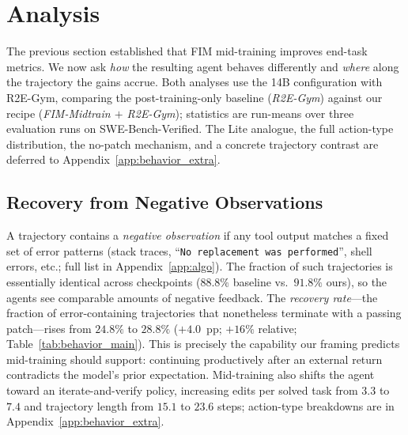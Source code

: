 
\section{Analysis}
\label{sec:analysis}
\vspace{-0.5ex}

The previous section established that FIM mid-training improves end-task
metrics. We now ask \emph{how} the resulting agent behaves differently
and \emph{where} along the trajectory the gains accrue. Both analyses
use the 14B configuration with R2E-Gym, comparing the
post-training-only baseline (\emph{R2E-Gym}) against our recipe
(\emph{FIM-Midtrain $+$ R2E-Gym}); statistics are run-means over three
evaluation runs on SWE-Bench-Verified. The Lite analogue, the full
action-type distribution, the no-patch mechanism, and a concrete
trajectory contrast are deferred to Appendix~\ref{app:behavior_extra}.

\vspace{-0.5ex}
\subsection{Recovery from Negative Observations}
\label{sec:analysis:recovery}

A trajectory contains a \emph{negative observation} if any tool output
matches a fixed set of error patterns (stack traces,
``\texttt{No replacement was performed}'', shell errors, etc.; full list
in Appendix~\ref{app:algo}). The fraction of such trajectories is
essentially identical across checkpoints ($88.8\%$ baseline vs.\
$91.8\%$ ours), so the agents see comparable amounts of negative
feedback. The \emph{recovery rate}---the fraction of error-containing
trajectories that nonetheless terminate with a passing patch---rises
from $24.8\%$ to $28.8\%$ ($+4.0$~pp; $+16\%$ relative;
Table~\ref{tab:behavior_main}). This is precisely the capability our
framing predicts mid-training should support: continuing productively
after an external return contradicts the model's prior expectation.
Mid-training also shifts the agent toward an iterate-and-verify policy,
increasing edits per solved task from $3.3$ to $7.4$ and trajectory
length from $15.1$ to $23.6$ steps; action-type breakdowns are in
Appendix~\ref{app:behavior_extra}.

